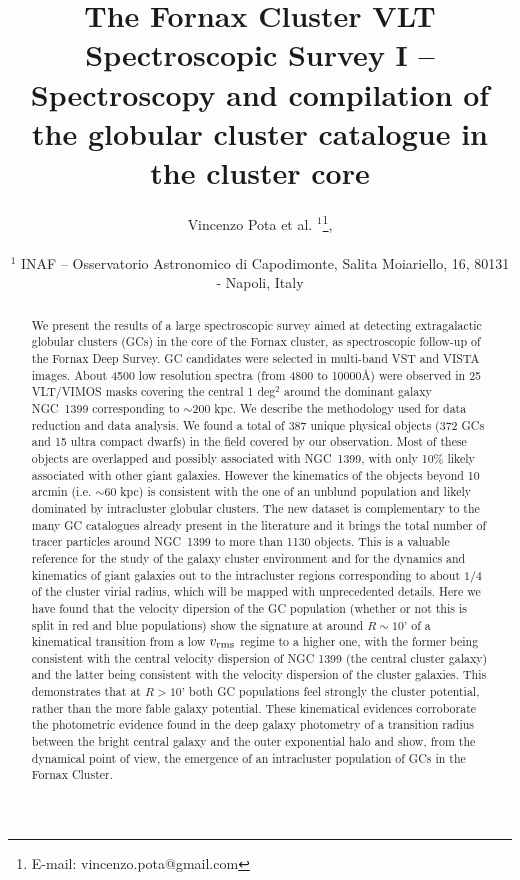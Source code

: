 \documentclass[useAMS,usenatbib]{mn2e}
\title[The Fornax Cluster VLT Spectroscopic Survey]{The Fornax Cluster VLT Spectroscopic Survey I -- Spectroscopy and compilation of the globular cluster catalogue in the cluster core}
\author[Pota et al.]{\noindent
Vincenzo Pota et al. $^{1}$\thanks{E-mail: vincenzo.pota@gmail.com}, 
\\~\\
$^1$ INAF -- Osservatorio Astronomico di Capodimonte, Salita Moiariello, 16, 80131 - Napoli, Italy\\
}
\begin{document}
\label{firstpage}

\maketitle
\begin{abstract}
We present the results of a large spectroscopic survey aimed at detecting extragalactic globular clusters (GCs) in the core of the Fornax cluster, as spectroscopic follow-up of the Fornax Deep Survey. GC candidates were selected in multi-band VST and VISTA images. About 4500 low resolution spectra (from 4800 to 10000\AA) were observed in 25 VLT/VIMOS masks covering the central 1 deg$^2$ around the dominant galaxy NGC~1399 corresponding to $\sim$200 kpc. We describe the methodology used for data reduction and data analysis. We found a total of 387 unique physical objects (372 GCs and 15 ultra compact dwarfs) in the field covered by our observation. Most of these objects are overlapped and possibly associated with NGC~1399, with only 10\% likely associated with other giant galaxies. However the kinematics of the objects beyond 10 arcmin (i.e. $\sim$60 kpc) is consistent with the one of an unblund population and likely dominated by intracluster globular clusters. The new dataset is complementary to the many GC catalogues already present in the literature and it brings the total number of tracer particles around  NGC~1399 to more than 1130 objects. This is a valuable reference for the study of the galaxy cluster environment and for the dynamics and kinematics of giant galaxies out to the intracluster regions corresponding to about $1/4$ of the cluster virial radius, which will be mapped with unprecedented details. Here we have found that the velocity dipersion of the GC population (whether or not this is split in red and blue populations) show the signature at around $R\sim10’$ of a kinematical transition from a low $v_{\rm rms}$ regime to a higher one, with the former being consistent with the central velocity dispersion of NGC 1399 (the central cluster galaxy) and the latter being consistent with the velocity dispersion of the cluster galaxies. This demonstrates that at $R>10’$ both GC populations feel strongly the cluster potential, rather than the more fable galaxy potential. These kinematical evidences corroborate the photometric evidence found in the deep galaxy photometry of a transition radius between the bright central galaxy and the outer exponential halo and show, from the dynamical point of view, the emergence of an intracluster population of GCs in the Fornax Cluster.

\end{abstract}
\end{document}

